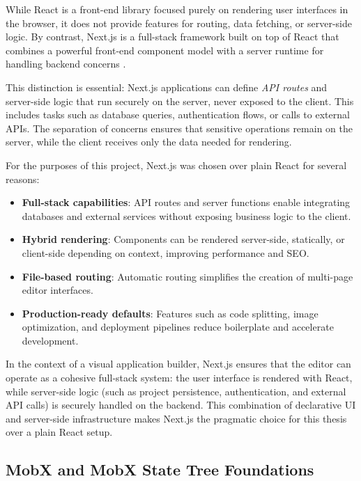 \documentclass[oneside,12pt]{book}
\begin{document}
While React is a front-end library focused purely on rendering user interfaces in the browser, it does not provide features for routing, data fetching, or server-side logic. 
By contrast, Next.js is a full-stack framework built on top of React that combines a powerful front-end component model with a server runtime for handling backend concerns \cite{vercel_nextjs}. 

This distinction is essential: Next.js applications can define \emph{API routes} and server-side logic that run securely on the server, never exposed to the client. 
This includes tasks such as database queries, authentication flows, or calls to external APIs. 
The separation of concerns ensures that sensitive operations remain on the server, while the client receives only the data needed for rendering. 

For the purposes of this project, Next.js was chosen over plain React for several reasons:

\begin{itemize}
  \item \textbf{Full-stack capabilities}: API routes and server functions enable integrating databases and external services without exposing business logic to the client.
  \item \textbf{Hybrid rendering}: Components can be rendered server-side, statically, or client-side depending on context, improving performance and SEO. 
  \item \textbf{File-based routing}: Automatic routing simplifies the creation of multi-page editor interfaces.
  \item \textbf{Production-ready defaults}: Features such as code splitting, image optimization, and deployment pipelines reduce boilerplate and accelerate development.
\end{itemize}

In the context of a visual application builder, Next.js ensures that the editor can operate as a cohesive full-stack system: the user interface is rendered with React, while server-side logic (such as project persistence, authentication, and external API calls) is securely handled on the backend. 
This combination of declarative UI and server-side infrastructure makes Next.js the pragmatic choice for this thesis over a plain React setup.

\subsection{MobX and MobX State Tree Foundations}
\label{sec:mobx-mst}
\end{document}
